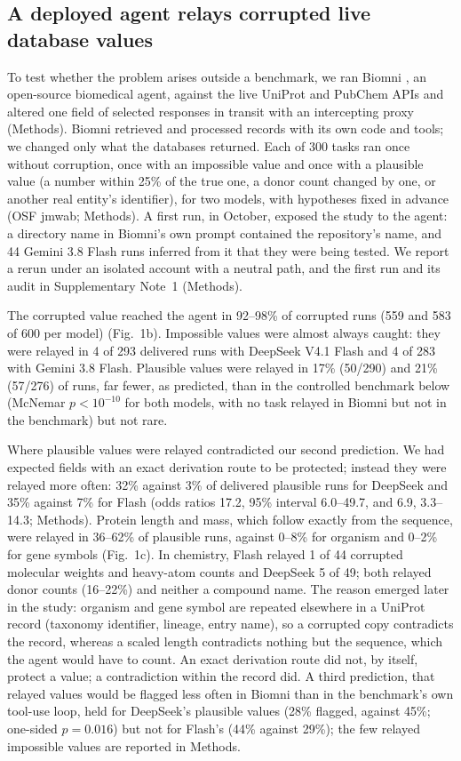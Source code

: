 \subsection*{A deployed agent relays corrupted live database values}

To test whether the problem arises outside a benchmark, we ran Biomni \citep{huang2026biomni}, an open-source biomedical agent, against the live UniProt and PubChem APIs and altered one field of selected responses in transit with an intercepting proxy (Methods). Biomni retrieved and processed records with its own code and tools; we changed only what the databases returned. Each of 300 tasks ran once without corruption, once with an impossible value and once with a plausible value (a number within 25\% of the true one, a donor count changed by one, or another real entity's identifier), for two models, with hypotheses fixed in advance (OSF jmwab; Methods). A first run, in October, exposed the study to the agent: a directory name in Biomni's own prompt contained the repository's name, and 44 Gemini 3.8 Flash runs inferred from it that they were being tested. We report a rerun under an isolated account with a neutral path, and the first run and its audit in Supplementary Note~1 (Methods).

The corrupted value reached the agent in 92--98\% of corrupted runs (559 and 583 of 600 per model) (Fig.~1b). Impossible values were almost always caught: they were relayed in 4 of 293 delivered runs with DeepSeek V4.1 Flash and 4 of 283 with Gemini 3.8 Flash. Plausible values were relayed in 17\% (50/290) and 21\% (57/276) of runs, far fewer, as predicted, than in the controlled benchmark below (McNemar $p < 10^{-10}$ for both models, with no task relayed in Biomni but not in the benchmark) but not rare.

Where plausible values were relayed contradicted our second prediction. We had expected fields with an exact derivation route to be protected; instead they were relayed more often: 32\% against 3\% of delivered plausible runs for DeepSeek and 35\% against 7\% for Flash (odds ratios 17.2, 95\% interval 6.0--49.7, and 6.9, 3.3--14.3; Methods). Protein length and mass, which follow exactly from the sequence, were relayed in 36--62\% of plausible runs, against 0--8\% for organism and 0--2\% for gene symbols (Fig.~1c). In chemistry, Flash relayed 1 of 44 corrupted molecular weights and heavy-atom counts and DeepSeek 5 of 49; both relayed donor counts (16--22\%) and neither a compound name. The reason emerged later in the study: organism and gene symbol are repeated elsewhere in a UniProt record (taxonomy identifier, lineage, entry name), so a corrupted copy contradicts the record, whereas a scaled length contradicts nothing but the sequence, which the agent would have to count. An exact derivation route did not, by itself, protect a value; a contradiction within the record did. A third prediction, that relayed values would be flagged less often in Biomni than in the benchmark's own tool-use loop, held for DeepSeek's plausible values (28\% flagged, against 45\%; one-sided $p = 0.016$) but not for Flash's (44\% against 29\%); the few relayed impossible values are reported in Methods.

